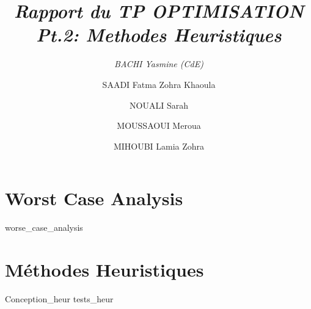 \documentclass[12pt,a4paper, titlepage]{article}
\title{\emph{Rapport du TP OPTIMISATION Pt.2: Methodes Heuristiques} }
\author{ 
    \emph{BACHI Yasmine (CdE)}
    \and
    SAADI Fatma Zohra Khaoula
    \and 
    NOUALI Sarah
    \and 
    MOUSSAOUI Meroua
    \and 
    MIHOUBI Lamia Zohra}
\begin{document}
\maketitle
\tableofcontents
\part{Worst Case Analysis}
{worse_case_analysis}
\newpage
\part{Méthodes Heuristiques}
{Conception_heur}
{tests_heur}
\begin{refsection}
    \nocite{*}
    \printbibliography[]
    \end{refsection}
\end{document}
